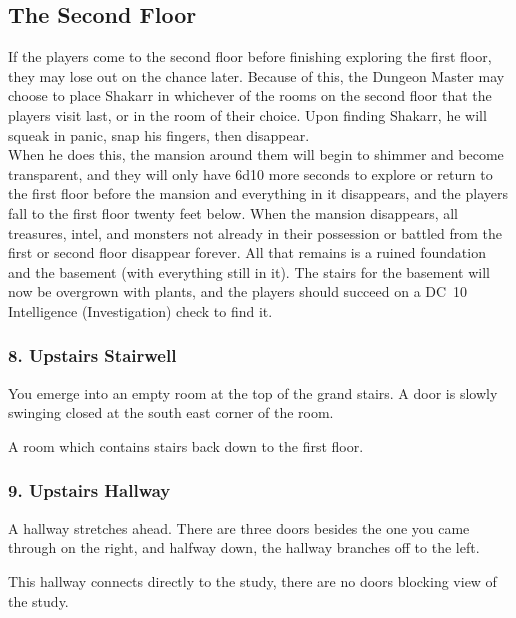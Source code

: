 \subsection{The Second Floor}
If the players come to the second floor before finishing exploring the first floor, they may lose out on the chance later. Because of this, the Dungeon Master may choose to place Shakarr in whichever of the rooms on the second floor that the players visit last, or in the room of their choice. Upon finding Shakarr, he will squeak in panic, snap his fingers, then disappear.\\
When he does this, the mansion around them will begin to shimmer and become transparent, and they will only have 6d10 more seconds to explore or return to the first floor before the mansion and everything in it disappears, and the players fall to the first floor twenty feet below. When the mansion disappears, all treasures, intel, and monsters not already in their possession or battled from the first or second floor disappear forever. All that remains is a ruined foundation and the basement (with everything still in it). The stairs for the basement will now be overgrown with plants, and the players should succeed on a DC~10 Intelligence (Investigation) check to find it.
\subsubsection{8. Upstairs Stairwell}
\begin{DndReadAloud}
    You emerge into an empty room at the top of the grand stairs. A door is slowly swinging closed at the south east corner of the room.
\end{DndReadAloud}
A room which contains stairs back down to the first floor.
\subsubsection{9. Upstairs Hallway}
\begin{DndReadAloud}
    A hallway stretches ahead. There are three doors besides the one you came through on the right, and halfway down, the hallway branches off to the left.
\end{DndReadAloud}
This hallway connects directly to the study, there are no doors blocking view of the study.
